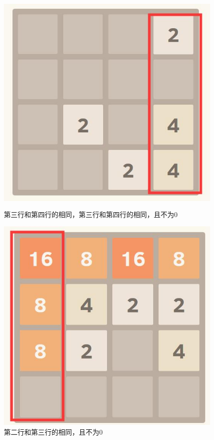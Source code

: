 \documentclass[UTF8]{article}
\begin{document}
	\begin{figure}[H]
		\begin{minipage}[H]{0.36\linewidth}
			\centering
			\includegraphics[scale=0.30]{34.jpg}
			\caption{第三行和第四行的相同，第三行和第四行的相同，且不为0}
			\label{34}
		\end{minipage}
		\qquad
		\begin{minipage}[H]{0.36\linewidth}
			\centering
			\includegraphics[scale=0.30]{23.jpg}
			\caption{第二行和第三行的相同，且不为0}
			\label{23}
		\end{minipage}
	\end{figure}
\end{document}
